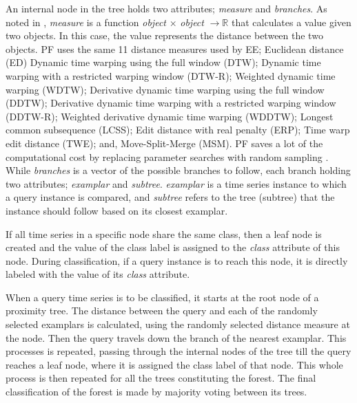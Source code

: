 An internal node in the tree holds two attributes; \emph{measure} and \emph{branches}.
As noted in \cite{lucas2019proximity}, \emph{measure} is a function \emph{object} $\times$ \emph{object} $\rightarrow\mathbb{R}$ that calculates a value given two objects.
In this case, the value represents the distance between the two objects.
PF uses the same 11 distance measures used by EE; Euclidean distance (ED) Dynamic time warping using the full window (DTW);
Dynamic time warping with a restricted warping window (DTW-R); Weighted dynamic time warping (WDTW);
Derivative dynamic time warping using the full window (DDTW); Derivative dynamic time warping with a restricted warping window (DDTW-R);
Weighted derivative dynamic time warping (WDDTW); Longest common subsequence (LCSS); Edit distance with real penalty (ERP);
Time warp edit distance (TWE); and, Move-Split-Merge (MSM).
PF saves a lot of the computational cost by replacing parameter searches with random sampling \cite{fawaz2020inceptiontime,fawaz2019deepreview}.
While \emph{branches} is a vector of the possible branches to follow, each branch holding two attributes; \emph{examplar} and \emph{subtree}.
\emph{examplar} is a time series instance to which a query instance is compared, and \emph{subtree} refers to the tree (subtree) that the instance should follow based on its closest examplar.

If all time series in a specific node share the same class, then a leaf node is created and the value of the class label is assigned to the \emph{class}
attribute of this node. During classification, if a query instance is to reach this node, it is directly labeled with the value of its \emph{class} attribute.

When a query time series is to be classified, it starts at the root node of a proximity tree.
The distance between the query and each of the randomly selected examplars is calculated, using the randomly selected distance measure at the node.
Then the query travels down the branch of the nearest examplar. This processes is repeated, passing through the internal nodes of the tree
till the query reaches a leaf node, where it is assigned the class label of that node. This whole process is then repeated for all the trees
constituting the forest. The final classification of the forest is made by majority voting between its trees.

